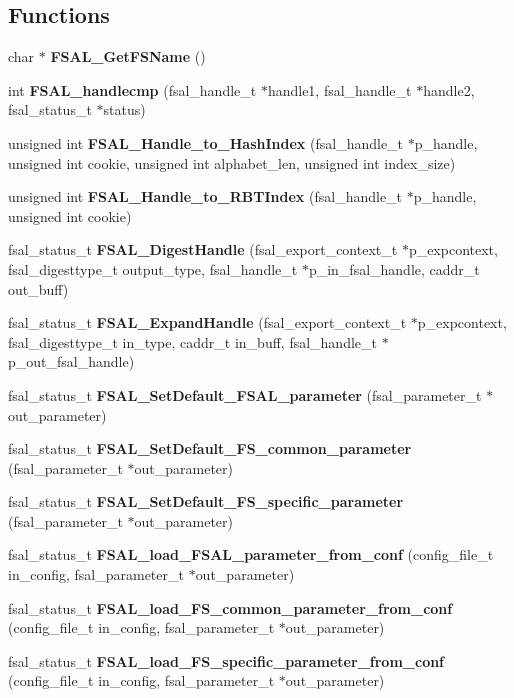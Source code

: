 \subsection*{Functions}
\begin{CompactItemize}
\item 
char $\ast$ \textbf{FSAL\_\-GetFSName} ()\label{fsal__tools_8c_5ce13ad306b54a091960744c763b3867}

\item 
int {\bf FSAL\_\-handlecmp} (fsal\_\-handle\_\-t $\ast$handle1, fsal\_\-handle\_\-t $\ast$handle2, fsal\_\-status\_\-t $\ast$status)
\item 
unsigned int {\bf FSAL\_\-Handle\_\-to\_\-HashIndex} (fsal\_\-handle\_\-t $\ast$p\_\-handle, unsigned int cookie, unsigned int alphabet\_\-len, unsigned int index\_\-size)
\item 
unsigned int \textbf{FSAL\_\-Handle\_\-to\_\-RBTIndex} (fsal\_\-handle\_\-t $\ast$p\_\-handle, unsigned int cookie)\label{fsal__tools_8c_0afe476befc56121cceeb82a69e458c5}

\item 
fsal\_\-status\_\-t {\bf FSAL\_\-DigestHandle} (fsal\_\-export\_\-context\_\-t $\ast$p\_\-expcontext, fsal\_\-digesttype\_\-t output\_\-type, fsal\_\-handle\_\-t $\ast$p\_\-in\_\-fsal\_\-handle, caddr\_\-t out\_\-buff)
\item 
fsal\_\-status\_\-t {\bf FSAL\_\-ExpandHandle} (fsal\_\-export\_\-context\_\-t $\ast$p\_\-expcontext, fsal\_\-digesttype\_\-t in\_\-type, caddr\_\-t in\_\-buff, fsal\_\-handle\_\-t $\ast$p\_\-out\_\-fsal\_\-handle)
\item 
fsal\_\-status\_\-t {\bf FSAL\_\-SetDefault\_\-FSAL\_\-parameter} (fsal\_\-parameter\_\-t $\ast$out\_\-parameter)
\item 
fsal\_\-status\_\-t \textbf{FSAL\_\-SetDefault\_\-FS\_\-common\_\-parameter} (fsal\_\-parameter\_\-t $\ast$out\_\-parameter)\label{fsal__tools_8c_7626d35bafe1d83233a23dac0309496a}

\item 
fsal\_\-status\_\-t \textbf{FSAL\_\-SetDefault\_\-FS\_\-specific\_\-parameter} (fsal\_\-parameter\_\-t $\ast$out\_\-parameter)\label{fsal__tools_8c_2c9026a0246b7163c494edfaaed5e8b5}

\item 
fsal\_\-status\_\-t {\bf FSAL\_\-load\_\-FSAL\_\-parameter\_\-from\_\-conf} (config\_\-file\_\-t in\_\-config, fsal\_\-parameter\_\-t $\ast$out\_\-parameter)
\item 
fsal\_\-status\_\-t \textbf{FSAL\_\-load\_\-FS\_\-common\_\-parameter\_\-from\_\-conf} (config\_\-file\_\-t in\_\-config, fsal\_\-parameter\_\-t $\ast$out\_\-parameter)\label{fsal__tools_8c_5e93d174a899b934ed30e8bedb143655}

\item 
fsal\_\-status\_\-t \textbf{FSAL\_\-load\_\-FS\_\-specific\_\-parameter\_\-from\_\-conf} (config\_\-file\_\-t in\_\-config, fsal\_\-parameter\_\-t $\ast$out\_\-parameter)\label{fsal__tools_8c_be783ef46edfd457473f20e3e5aa4073}

\end{CompactItemize}


